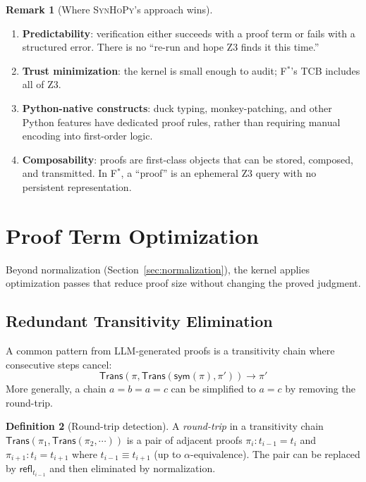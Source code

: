 \documentclass[11pt,a4paper]{report}
\theoremstyle{definition}
\newtheorem{definition}{Definition}[chapter]
\newtheorem{remark}[definition]{Remark}
\theoremstyle{plain}
\newcommand{\Refl}{\mathsf{refl}}
\newcommand{\sym}{\mathsf{sym}}
\newcommand{\Trans}{\mathsf{Trans}}
\newcommand{\fstar}{F$^{*}$}
\newcommand{\synhopy}{\textsc{SynHoPy}}
\begin{document}
\begin{remark}[Where \synhopy{}'s approach wins]
\begin{enumerate}
  \item \textbf{Predictability}: verification either succeeds with a
    proof term or fails with a structured error. There is no
    ``re-run and hope Z3 finds it this time.''
  \item \textbf{Trust minimization}: the kernel is small enough to
    audit; \fstar{}'s TCB includes all of Z3.
  \item \textbf{Python-native constructs}: duck typing, monkey-patching,
    and other Python features have dedicated proof rules, rather than
    requiring manual encoding into first-order logic.
  \item \textbf{Composability}: proofs are first-class objects that can
    be stored, composed, and transmitted. In \fstar{}, a ``proof'' is an
    ephemeral Z3 query with no persistent representation.
\end{enumerate}
\end{remark}


\section{Proof Term Optimization}
\label{sec:optimization}

Beyond normalization (Section~\ref{sec:normalization}), the kernel
applies optimization passes that reduce proof size without changing
the proved judgment.

\subsection{Redundant Transitivity Elimination}

A common pattern from LLM-generated proofs is a transitivity chain
where consecutive steps cancel:
\[
  \Trans(\pi, \Trans(\sym(\pi), \pi')) \longrightarrow \pi'
\]
More generally, a chain $a = b = a = c$ can be simplified to $a = c$
by removing the round-trip.

\begin{definition}[Round-trip detection]
A \emph{round-trip} in a transitivity chain
$\Trans(\pi_1, \Trans(\pi_2, \cdots))$ is a pair of adjacent proofs
$\pi_i : t_{i-1} = t_i$ and $\pi_{i+1} : t_i = t_{i+1}$ where
$t_{i-1} \equiv t_{i+1}$ (up to $\alpha$-equivalence). The pair
can be replaced by $\Refl_{t_{i-1}}$ and then eliminated by
normalization.
\end{definition}
\end{document}
